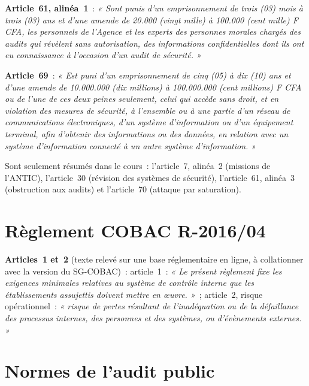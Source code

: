 \begin{boxjuris}
\medskip
\textbf{Article~61, alinéa~1}~: \textit{« Sont punis d'un emprisonnement de
trois (03) mois à trois (03) ans et d'une amende de 20.000 (vingt mille) à
100.000 (cent mille) F CFA, les personnels de l'Agence et les experts des
personnes morales chargés des audits qui révèlent sans autorisation, des
informations confidentielles dont ils ont eu connaissance à l'occasion d'un
audit de sécurité. »}

\medskip
\textbf{Article~69}~: \textit{« Est puni d'un emprisonnement de cinq (05) à
dix (10) ans et d'une amende de 10.000.000 (dix millions) à 100.000.000
(cent millions) F CFA ou de l'une de ces deux peines seulement, celui qui
accède sans droit, et en violation des mesures de sécurité, à l'ensemble ou
à une partie d'un réseau de communications électroniques, d'un système
d'information ou d'un équipement terminal, afin d'obtenir des informations
ou des données, en relation avec un système d'information connecté à un
autre système d'information. »}
\end{boxjuris}

Sont seulement résumés dans le cours~: l'article~7, alinéa~2 (missions de
l'ANTIC), l'article~30 (révision des systèmes de sécurité), l'article~61,
alinéa~3 (obstruction aux audits) et l'article~70 (attaque par
saturation).

\section*{Règlement COBAC R-2016/04}

\begin{boxjuris}
\textbf{Articles~1 et~2} (texte relevé sur une base réglementaire en ligne,
à collationner avec la version du SG-COBAC)~: article~1~: \textit{« Le
présent règlement fixe les exigences minimales relatives au système de
contrôle interne que les établissements assujettis doivent mettre en
œuvre. »}~; article~2, risque opérationnel~: \textit{« risque de pertes
résultant de l'inadéquation ou de la défaillance des processus internes, des
personnes et des systèmes, ou d'évènements externes. »}
\end{boxjuris}

\section*{Normes de l'audit public}

